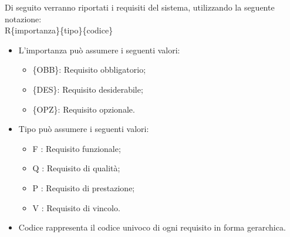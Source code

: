Di seguito verranno riportati i requisiti del sistema, utilizzando la seguente notazione:\\
R\{importanza\}\{tipo\}\{codice\}

\begin{itemize}
	\item L'importanza può assumere i seguenti valori:
	\begin{itemize}
		\item \{OBB\}: Requisito obbligatorio;
		\item \{DES\}: Requisito desiderabile;
		\item \{OPZ\}: Requisito opzionale.
	\end{itemize}
	
	\item Tipo può assumere i seguenti valori:
	\begin{itemize}
		\item {F} : Requisito funzionale;
		\item {Q} : Requisito di qualità;
		\item {P} : Requisito di prestazione;
		\item {V} : Requisito di vincolo.
	\end{itemize}
	
	\item Codice rappresenta il codice univoco di ogni requisito in forma gerarchica.
\end{itemize}
\newpage


\newpage


\newpage


\newpage


\newpage